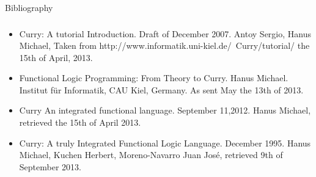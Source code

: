 \documentclass{beamer}
\begin{document}
\begin{section}{Bibliography}
  \begin{frame}
    \frametitle{\secname}
    \begin{itemize}
    \item Curry: A tutorial Introduction. Draft of December 2007. Antoy Sergio, Hanus Michael, Taken from http://www.informatik.uni-kiel.de/~Curry/tutorial/ the 15th of April, 2013.


    \item Functional Logic Programming: From Theory to Curry. Hanus Michael. Institut f\"ur Informatik, CAU Kiel, Germany. As sent May the 13th of 2013.

    \item Curry An integrated functional language. September 11,2012. Hanus Michael, retrieved the 15th of April 2013.

    \item Curry: A truly Integrated Functional Logic Language. December 1995. Hanus Michael, Kuchen Herbert, Moreno-Navarro Juan Jos\'e, retrieved 9th of September 2013.
      
    \end{itemize}

\end{frame}
\end{section}
\end{document}

